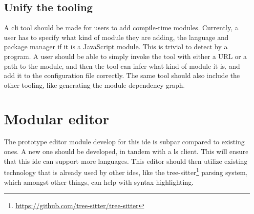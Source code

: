 \subsection{Unify the tooling}

A \gls{cli} tool should be made for users to add compile-time modules.
Currently, a user has to specify what kind of module they are adding, the
language and package manager if it is a JavaScript module. This is trivial to
detect by a program. A user should be able to simply invoke the tool with
either a URL or a path to the module, and then the tool can infer what kind of
module it is, and add it to the configuration file correctly. The same tool
should also include the other tooling, like generating the module dependency
graph.

\section{Modular editor}

The prototype editor module develop for this \gls*{ide} is subpar compared to
existing ones. A new one should be developed, in tandem with a \gls*{ls} client.
This will ensure that this \gls*{ide} can support more languages. This editor
should then utilize existing technology that is already used by other
\gls*{ide}s, like the tree-sitter\footnote{\url{https://github.com/tree-sitter/tree-sitter}}
parsing system, which amongst other things, can help with syntax highlighting.
